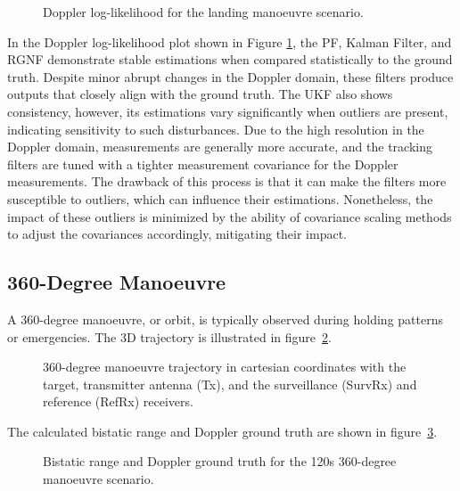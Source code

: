 \begin{figure}[H]
    \centering
    
    \caption{Doppler log-likelihood for the landing manoeuvre scenario.}
    \label{fig:dopplerLogLikeLanding}
\end{figure}

In the Doppler log-likelihood plot shown in Figure \ref{fig:dopplerLogLikeLanding}, the \ac{PF}, Kalman Filter, and \ac{RGNF} demonstrate stable estimations when compared statistically to the ground truth. Despite minor abrupt changes in the Doppler domain, these filters produce outputs that closely align with the ground truth. The \ac{UKF} also shows consistency, however, its estimations vary significantly when outliers are present, indicating sensitivity to such disturbances. Due to the high resolution in the Doppler domain, measurements are generally more accurate, and the tracking filters are tuned with a tighter measurement covariance for the Doppler measurements. The drawback of this process is that it can make the filters more susceptible to outliers, which can influence their estimations. Nonetheless, the impact of these outliers is minimized by the ability of covariance scaling methods to adjust the covariances accordingly, mitigating their impact.

\subsection{360-Degree Manoeuvre}
A 360-degree manoeuvre, or orbit, is typically observed during holding patterns or emergencies. The \ac{3D} trajectory is illustrated in figure~\ref{fig:360_3D}.
\newline
\begin{figure}[H]
    \centering
    
    \caption{360-degree manoeuvre trajectory in cartesian coordinates with the target, transmitter antenna (Tx), and the surveillance (SurvRx) and reference (RefRx) receivers.}
    \label{fig:360_3D}
\end{figure}


    
The calculated bistatic range and Doppler ground truth are shown in figure~\ref{fig:360RangeDoppler}.

\begin{figure}[H]
    \centering
    
    \caption{Bistatic range and Doppler ground truth for the 120s 360-degree manoeuvre scenario.}
    \label{fig:360RangeDoppler}
\end{figure}

